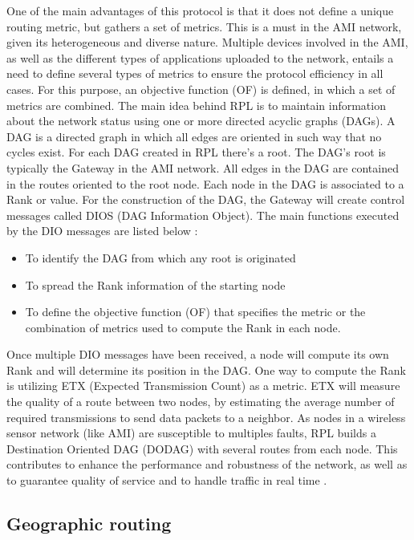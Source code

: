 \documentclass[11pt,draftclsnofoot,onecolumn]{IEEEtran}
\begin{document}
One of the main advantages of this protocol is that it does not define a unique routing metric, but gathers a set of metrics. This is a must in the AMI network, given its heterogeneous and diverse nature. Multiple devices involved in the AMI, as well as the different types of applications uploaded to the network, entails a need to define several types of metrics to ensure the protocol efficiency in all cases. For this purpose, an objective function (OF) is defined, in which a set of metrics are combined. 
The main idea behind RPL is to maintain information about the network status using one or more directed acyclic graphs (DAGs). A DAG is a directed graph in which all edges are oriented in such way that no cycles exist. For each DAG created in RPL there’s a root. The DAG’s root is typically the Gateway in the AMI network. All edges in the DAG are contained in the routes oriented to the root node. Each node in the DAG is associated to a Rank or value. For the construction of the DAG, the Gateway will create control messages called DIOS (DAG Information Object). The main functions executed by the DIO messages are listed below  \cite{Iyer2011a}:


\begin{itemize}
	\item To identify the DAG from which any root is originated
	\item To spread the Rank information of the starting node
	\item To define the objective function (OF) that specifies the metric or the combination of metrics used to compute the Rank in each node.
\end{itemize}

Once multiple DIO messages have been received, a node will compute its own Rank and will determine its position in the DAG. One way to compute the Rank is utilizing ETX (Expected Transmission Count) as a metric. ETX will measure the quality of a route between two nodes, by estimating the average number of required transmissions to send data packets to a neighbor. As nodes in a wireless sensor network (like AMI) are susceptible to multiples faults, RPL builds a Destination Oriented DAG (DODAG) with several routes from each node. This contributes to enhance the performance and robustness of the network, as well as to guarantee quality of service and to handle traffic in real time  \cite{Pavkovic2011}.

\subsection{Geographic routing}\label{geographic}
\end{document}
